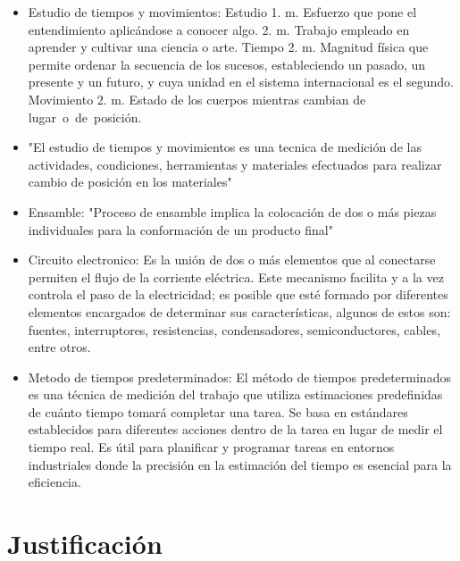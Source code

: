     \begin{itemize}
        \item Estudio de tiempos y movimientos: Estudio
        1. m. Esfuerzo que pone el entendimiento aplicándose a conocer algo.
        2. m. Trabajo empleado en aprender y cultivar una ciencia o arte.
       Tiempo
        2. m. Magnitud física que permite ordenar la secuencia de los sucesos, estableciendo un pasado, un presente y un futuro, y cuya unidad en el sistema internacional es el segundo.  Movimiento
        2. m. Estado de los cuerpos mientras cambian de lugar o de posición.
        \item "El estudio de tiempos y movimientos es una tecnica de medición de las actividades, condiciones, herramientas y materiales efectuados para  realizar cambio de posición en los materiales"
        \item Ensamble:
        "Proceso de ensamble implica la colocación de dos o más piezas individuales para la conformación de un producto final"
        \item Circuito electronico: Es la unión de dos o más elementos que al conectarse permiten el flujo de la corriente eléctrica. Este mecanismo facilita y a la vez controla el paso de la electricidad; es posible que esté formado por diferentes elementos encargados de determinar sus características, algunos de estos son: fuentes, interruptores, resistencias, condensadores, semiconductores, cables, entre otros.
        \item Metodo de tiempos predeterminados: El método de tiempos predeterminados es una técnica de medición del trabajo que utiliza estimaciones predefinidas de cuánto tiempo tomará completar una tarea. Se basa en estándares establecidos para diferentes acciones dentro de la tarea en lugar de medir el tiempo real. Es útil para planificar y programar tareas en entornos industriales donde la precisión en la estimación del tiempo es esencial para la eficiencia.
    \end{itemize}
    \section{Justificación}
    
